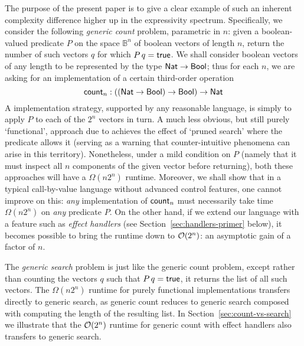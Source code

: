 \documentclass[12pt,phd,lfcs,twoside,openright,logo,leftchapter,normalheadings]{infthesis}
\theoremstyle{plain}
\theoremstyle{definition}
\begin{document}
The purpose of the present paper is to give a clear example of such an
inherent complexity difference higher up in the expressivity spectrum.
Specifically, we consider the following \emph{generic count} problem,
parametric in $n$: given a boolean-valued predicate $P$ on the space
${\mathbb B}^n$ of boolean vectors of length $n$, return the number of
such vectors $q$ for which $P\,q = \mathsf{true}$.  We shall consider boolean
vectors of any length to be represented by the type $\mathsf{Nat} \to \mathsf{Bool}$;
thus for each $n$, we are asking for an implementation of a certain
third-order operation
%
\[ \mathsf{count}_n : ((\mathsf{Nat} \to \mathsf{Bool}) \to \mathsf{Bool}) \to \mathsf{Nat}  \]
%
A \naive implementation strategy, supported by any reasonable
language, is simply to apply $P$ to each of the $2^n$ vectors in turn.
A much less obvious, but still purely `functional', approach due to
\citet{Berger90} achieves the effect of `pruned search' where the
predicate allows it (serving as a warning that counter-intuitive
phenomena can arise in this territory).  Nonetheless, under a mild
condition on $P$ (namely that it must inspect all $n$ components of
the given vector before returning), both these approaches will have a
$\Omega(n 2^n)$ runtime.  Moreover, we shall show that in a typical
call-by-value language without advanced control features, one cannot
improve on this: \emph{any} implementation of $\mathsf{count}_n$ must
necessarily take time $\Omega(n2^n)$ on \emph{any} predicate $P$.  On
the other hand, if we extend our language with a feature such as
\emph{effect handlers} (see Section~\ref{sec:handlers-primer} below),
it becomes possible to bring the runtime down to $\mathcal{O}(2^n)$: an
asymptotic gain of a factor of $n$.

The \emph{generic search} problem is just like the generic count
problem, except rather than counting the vectors $q$ such that $P\,q =
\mathsf{true}$, it returns the list of all such vectors.
%
The $\Omega(n 2^n)$ runtime for purely functional implementations
transfers directly to generic search, as generic count reduces to
generic search composed with computing the length of the resulting
list.
%
In Section~\ref{sec:count-vs-search} we illustrate that the
$\mathcal{O}(2^n)$ runtime for generic count with effect handlers also
transfers to generic search.
\end{document}
